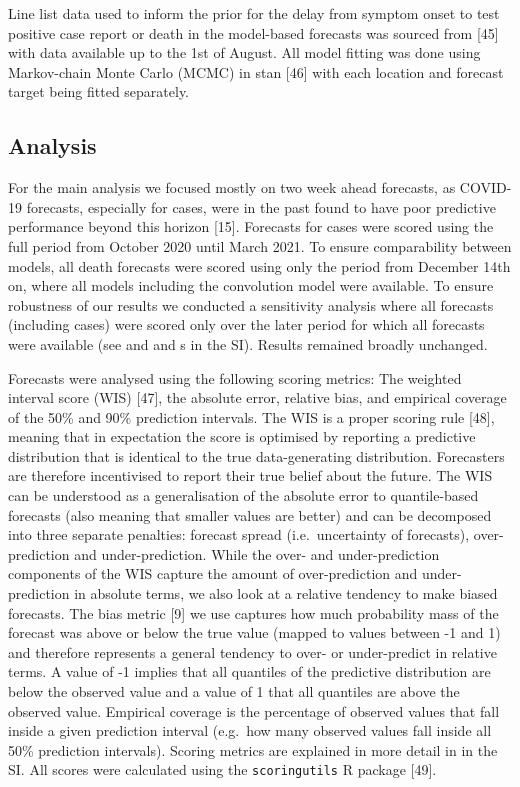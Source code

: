 \documentclass[10pt,letterpaper]{article}
\begin{document}
Line list data used to inform the prior for the delay from symptom onset
to test positive case report or death in the model-based forecasts was
sourced from {[}45{]} with data available up to the 1st of August. All
model fitting was done using Markov-chain Monte Carlo (MCMC) in stan
{[}46{]} with each location and forecast target being fitted separately.

\hypertarget{analysis}{%
\subsection{Analysis}\label{analysis}}

For the main analysis we focused mostly on two week ahead forecasts, as
COVID-19 forecasts, especially for cases, were in the past found to have
poor predictive performance beyond this horizon {[}15{]}. Forecasts for
cases were scored using the full period from October 2020 until March
2021. To ensure comparability between models, all death forecasts were
scored using only the period from December 14th on, where all models
including the convolution model were available. To ensure robustness of
our results we conducted a sensitivity analysis where all forecasts
(including cases) were scored only over the later period for which all
forecasts were available (see  and
 and s
in the SI). Results remained broadly unchanged.

Forecasts were analysed using the following scoring metrics: The
weighted interval score (WIS) {[}47{]}, the absolute error, relative
bias, and empirical coverage of the 50\% and 90\% prediction intervals.
The WIS is a proper scoring rule {[}48{]}, meaning that in expectation
the score is optimised by reporting a predictive distribution that is
identical to the true data-generating distribution. Forecasters are
therefore incentivised to report their true belief about the future. The
WIS can be understood as a generalisation of the absolute error to
quantile-based forecasts (also meaning that smaller values are better)
and can be decomposed into three separate penalties: forecast spread
(i.e.~uncertainty of forecasts), over-prediction and under-prediction.
While the over- and under-prediction components of the WIS capture the
amount of over-prediction and under-prediction in absolute terms, we
also look at a relative tendency to make biased forecasts. The bias
metric {[}9{]} we use captures how much probability mass of the forecast
was above or below the true value (mapped to values between -1 and 1)
and therefore represents a general tendency to over- or under-predict in
relative terms. A value of -1 implies that all quantiles of the
predictive distribution are below the observed value and a value of 1
that all quantiles are above the observed value. Empirical coverage is
the percentage of observed values that fall inside a given prediction
interval (e.g.~how many observed values fall inside all 50\% prediction
intervals). Scoring metrics are explained in more detail in
 in the SI. All scores were calculated
using the \texttt{scoringutils} R package {[}49{]}.
\end{document}
